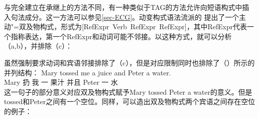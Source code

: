 \begin{sloppypar}
与完全建立在承继上的方法不同，有一种类似于TAG的方法允许向短语构式中插入句法成分。这一方法可以参见\ref{sec-ECG}。动变构式语法流派的 \citet[]{BC2005a}提出了一个主动"=双及物构式，形式为\mbox{[RefExpr Verb RefExpr RefExpr]}，其中RefExpr代表一个指称表达，第一个RefExpr和动词可能不邻接。以这种方式，就可以分析（a,b），并排除（c）：
\end{sloppypar}
\eal
{}
\zl
虽然强制要求动词和宾语邻接排除了（c），但是对应限制同时也排除了（）所示的并列结构：
\ea
\gll Mary tossed me a juice and Peter a water.\\
    Mary 扔 我 一 果汁 并且 Peter 一 水\\
\z
这一句子的部分意义对应双及物构式赋予Mary tossed Peter a water的意义。但是tossed和Peter之间有一个空位。同样，可以造出双及物构式两个宾语之间存在空位的例子：
